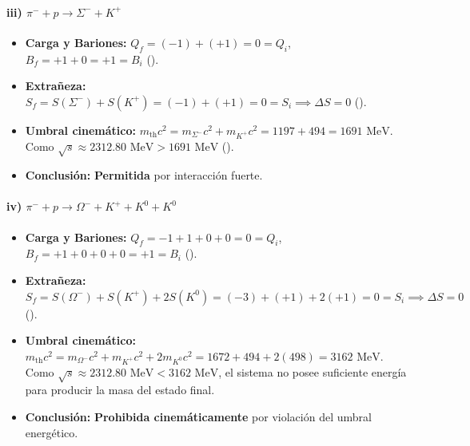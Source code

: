 \begin{problema}
\paragraph{iii) $\pi^- + p \longrightarrow \Sigma^- + K^+$}
\begin{itemize}
    \item \textbf{Carga y Bariones:} $Q_f = (-1) + (+1) = 0 = Q_i$, $B_f = +1 + 0 = +1 = B_i$ (\checkmark).
    \item \textbf{Extrañeza:} $S_f = S(\Sigma^-) + S(K^+) = (-1) + (+1) = 0 = S_i \implies \Delta S = 0$ (\checkmark).
    \item \textbf{Umbral cinemático:} $m_{\text{th}} c^2 = m_{\Sigma^-} c^2 + m_{K^+} c^2 = 1197 + 494 = 1691\text{ MeV}$. Como $\sqrt{s} \approx 2312.80\text{ MeV} > 1691\text{ MeV}$ (\checkmark).
    \item \textbf{Conclusión:} \textbf{Permitida} por interacción fuerte.
\end{itemize}

\paragraph{iv) $\pi^- + p \longrightarrow \Omega^- + K^+ + K^0 + K^0$}
\begin{itemize}
    \item \textbf{Carga y Bariones:} $Q_f = -1 + 1 + 0 + 0 = 0 = Q_i$, $B_f = +1 + 0 + 0 + 0 = +1 = B_i$ (\checkmark).
    \item \textbf{Extrañeza:} $S_f = S(\Omega^-) + S(K^+) + 2 S(K^0) = (-3) + (+1) + 2(+1) = 0 = S_i \implies \Delta S = 0$ (\checkmark).
    \item \textbf{Umbral cinemático:} $m_{\text{th}} c^2 = m_{\Omega^-} c^2 + m_{K^+} c^2 + 2 m_{K^0} c^2 = 1672 + 494 + 2(498) = 3162\text{ MeV}$.
    Como $\sqrt{s} \approx 2312.80\text{ MeV} < 3162\text{ MeV}$, el sistema no posee suficiente energía para producir la masa del estado final.
    \item \textbf{Conclusión:} \textbf{Prohibida cinemáticamente} por violación del umbral energético.
\end{itemize}
\end{problema}
\newpage
